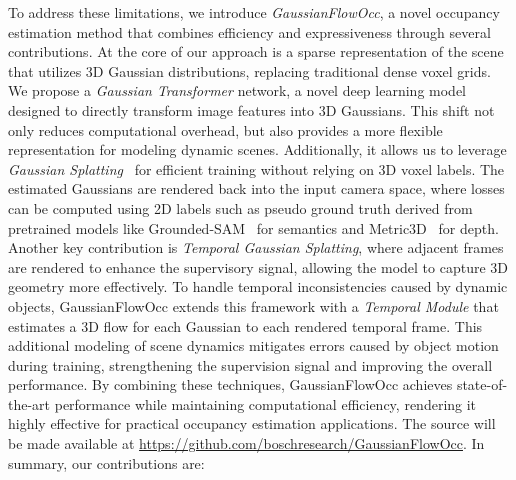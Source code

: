 \documentclass[10pt,twocolumn,letterpaper]{article}
\begin{document}
To address these limitations, we introduce \emph{GaussianFlowOcc}, a novel occupancy estimation method that combines efficiency and expressiveness through several contributions.
At the core of our approach is a sparse representation of the scene that utilizes 3D Gaussian distributions, replacing traditional dense voxel grids.
We propose a \emph{Gaussian Transformer} network, a novel deep learning model designed to directly transform image features into 3D Gaussians.
This shift not only reduces computational overhead, but also provides a more flexible representation for modeling dynamic scenes.
Additionally, it allows us to leverage \emph{Gaussian Splatting}~\cite{kerbl20233d} for efficient training without relying on 3D voxel labels.
The estimated Gaussians are rendered back into the input camera space, where losses can be computed using 2D labels such as pseudo ground truth derived from pretrained models like Grounded-SAM~\cite{ren2024grounded} for semantics and Metric3D~\cite{yin2023metric3d} for depth.
Another key contribution is \emph{Temporal Gaussian Splatting}, where adjacent frames are rendered to enhance the supervisory signal, allowing the model to capture 3D geometry more effectively.
To handle temporal inconsistencies caused by dynamic objects, GaussianFlowOcc extends this framework with a \emph{Temporal Module} that estimates a 3D flow for each Gaussian to each rendered temporal frame.
This additional modeling of scene dynamics mitigates errors caused by object motion during training, strengthening the supervision signal and improving the overall performance.
By combining these techniques, GaussianFlowOcc achieves state-of-the-art performance while maintaining computational efficiency, rendering it highly effective for practical occupancy estimation applications.
The source will be made available at \url{https://github.com/boschresearch/GaussianFlowOcc}.
In summary, our contributions are:
\end{document}

